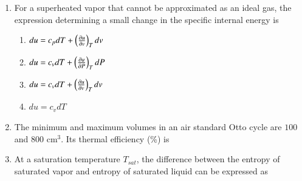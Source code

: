 \documentclass[a4paper,10pt]{article}
\begin{document}
\begin{enumerate}
    \hfill{}
    \begin{enumerate}
    \end{enumerate}
    
    \item For a superheated vapor that cannot be approximated as an ideal gas, the expression determining a small change in the specific internal energy is
    
    \hfill{}
    \begin{enumerate}
        \item $du = c_p dT + \left(\frac{\partial u}{\partial v}\right)_T dv$
        \item $du = c_v dT + \left(\frac{\partial u}{\partial P}\right)_T dP$
        \item $du = c_v dT + \left(\frac{\partial u}{\partial v}\right)_T dv$
        \item $du = c_v dT$
    \end{enumerate}
    
    \item The minimum and maximum volumes in an air standard Otto cycle are $100$ and $800$ cm$^3$. Its thermal efficiency (\%) is
    
    \hfill{}
    \begin{enumerate}
    \end{enumerate}

    \item At a saturation temperature $T_{sat}$, the difference between the entropy of saturated vapor and entropy of saturated liquid can be expressed as
    
    \hfill{}
    \begin{enumerate}
    \end{enumerate}


\end{enumerate}
\end{document}
